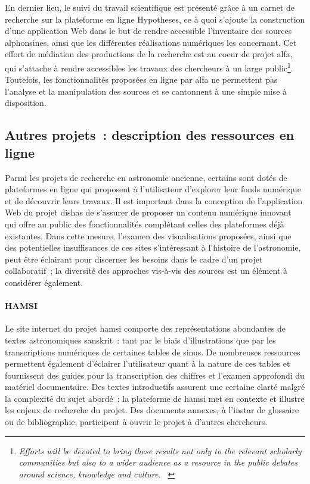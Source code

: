 \documentclass[a4paper,12pt,twoside]{book}
\newcommand{\eng}{\emph}
\newcommand{\g}[1]{\og#1~\fg}
\newcommand{\dishas}{\gls{dishas}\xspace}
\newcommand{\alfa}{\gls{alfa}\xspace}
\newcommand{\hamsi}{\gls{hamsi}\xspace}
\begin{document}
En dernier lieu, le suivi du travail scientifique est présenté grâce à un carnet de recherche sur la plateforme en ligne Hypotheses, ce à quoi s'ajoute la construction d'une application Web dans le but de rendre accessible l'inventaire des sources alphonsines, ainsi que les différentes réalisations numériques les concernant. Cet effort de médiation des productions de la recherche est au coeur de projet \alfa, qui s'attache à rendre accessibles les travaux des chercheurs à un large public\footnote{\g{\eng{Efforts will be devoted to bring these results not only to the relevant scholarly communities but also to a wider audience as a resource in the public debates around science, knowledge and culture.}} \cite{ShapingEuropeanScientific}}. Toutefois, les fonctionnalités proposées en ligne par \alfa ne permettent pas l'analyse et la manipulation des sources et se cantonnent à une simple mise à disposition.

		\subsection{Autres projets~: description des ressources en ligne}
Parmi les projets de recherche en astronomie ancienne, certains sont dotés de plateformes en ligne qui proposent à l'utilisateur d'explorer leur fonds numérique et de découvrir leurs travaux. Il est important dans la conception de l'application Web du projet \dishas de s'assurer de proposer un contenu numérique innovant qui offre au public des fonctionnalités complétant celles des plateformes déjà existantes. Dans cette mesure, l'examen des visualisations proposées, ainsi que des potentielles insuffisances de ces sites s'intéressant à l'histoire de l'astronomie, peut être éclairant pour discerner les besoins dans le cadre d'un projet collaboratif~; la diversité des approches vis-à-vis des sources est un élément à considérer également. 

				\paragraph{HAMSI}
Le site internet du projet \hamsi comporte des représentations abondantes de textes astronomiques sanskrit~: tant par le biais d'illustrations que par les transcriptions numériques de certaines tables de sinus. De nombreuses ressources permettent également d'éclairer l'utilisateur quant à la nature de ces tables et fournissent des guides pour la transcription des chiffres et l'examen approfondi du matériel documentaire. Des textes introductifs assurent une certaine clarté malgré la complexité du sujet abordé~: la plateforme de \hamsi met en contexte et illustre les enjeux de recherche du projet. Des documents annexes, à l'instar de glossaire ou de bibliographie, participent à ouvrir le projet à d'autres chercheurs.
\end{document}
